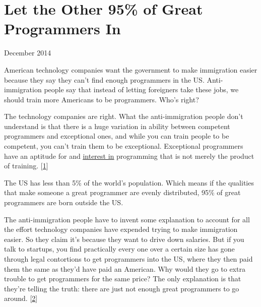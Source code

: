 \chapter{Let the Other 95\% of Great Programmers In}


            
              
                

December 2014

American technology companies want
                  the government to make immigration easier because they say
                  they can't find enough programmers in the US. Anti-immigration
                  people say that instead of letting foreigners take these jobs,
                  we should train more Americans to be programmers. Who's
                  right?

The technology companies are right. What the
                  anti-immigration people don't understand is that there is a
                  huge variation in ability between competent programmers and
                  exceptional ones, and while you can train people to be
                  competent, you can't train them to be exceptional. Exceptional
                  programmers have an aptitude for and
                  \href{http://www.paulgraham.com/genius.html}{\underline{interest in}}
                  programming that is not merely the product of training.
                  [\href{\#f1n}{1}]

The US has less than 5\% of the world's
                  population. Which means if the qualities that make someone a
                  great programmer are evenly distributed, 95\% of great
                  programmers are born outside the US.

The
                  anti-immigration people have to invent some explanation to
                  account for all the effort technology companies have expended
                  trying to make immigration easier. So they claim it's because
                  they want to drive down salaries. But if you talk to startups,
                  you find practically every one over a certain size has gone
                  through legal contortions to get programmers into the US,
                  where they then paid them the same as they'd have paid an
                  American. Why would they go to extra trouble to get
                  programmers for the same price? The only explanation is that
                  they're telling the truth: there are just not enough great
                  programmers to go around.
                  [\href{\#f2n}{2}]

